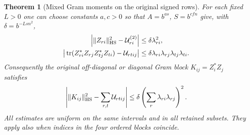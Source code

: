 \documentclass[a4paper,11pt]{article}
\newtheorem{theorem}[proposition]{Theorem}
\theoremstyle{definition}
\theoremstyle{remark}
\numberwithin{equation}{section}
\begin{document}
\begin{theorem}[Mixed Gram moments on the original signed rows]
\leavevmode\label{thm:fourkernels622}
For each fixed \(L>0\) one can choose constants \(a,c>0\)
so that \(A=b^{as}\), \(S=b^{cfn}\) give, with
\(\delta=b^{-Lsn^2}\),
\begin{align*}
 \left|\|Z_{ri}\|_{\rm HS}^2-\mathcal U_{ri}^{(2)}\right|
   &\le \delta\lambda_{ri}^2,\\
 \big|\operatorname{tr}(Z_{ri}^*Z_{rj}Z_{tj}^*Z_{ti})
           -\mathcal U_{rtij}\big|
   &\le\delta\lambda_{ri}\lambda_{rj}\lambda_{tj}\lambda_{ti}.
\end{align*}
Consequently the original off-diagonal or diagonal Gram block
\(K_{ij}=Z_i^*Z_j\) satisfies
\[
   \left|\|K_{ij}\|_{\rm HS}^2-\sum_{r,t}\mathcal U_{rtij}\right|
       \le\delta\left(\sum_r\lambda_{ri}\lambda_{rj}\right)^2 .
\]
All estimates are uniform on the same intervals and in all
retained subsets. They apply also when indices in the four
ordered blocks coincide.
\end{theorem}
\end{document}
